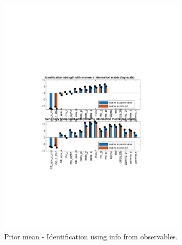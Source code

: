 
\begin{figure}[H]
\centering 
\includegraphics[width=0.8\textwidth]{nash/identification/nash_ident_strength_prior_mean}
\caption{Prior mean  - Identification using info from observables.}\label{Fig:ident:prior_mean}
\end{figure}

